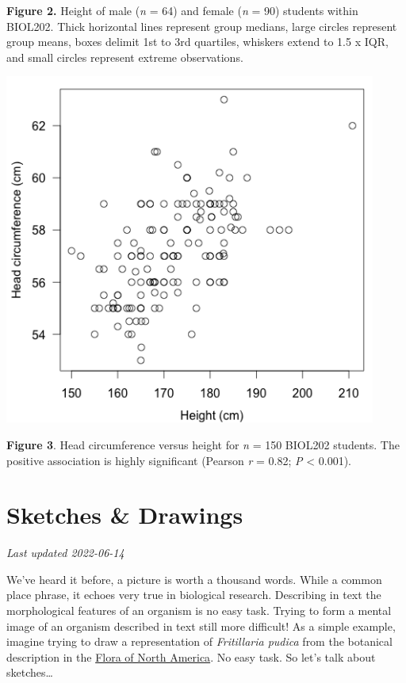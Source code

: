 \documentclass[
]{book}
\begin{document}
\textbf{Figure 2.} Height of male (\emph{n} = 64) and female (\emph{n} = 90) students within BIOL202. Thick horizontal lines represent group medians, large circles represent group means, boxes delimit 1st to 3rd quartiles, whiskers extend to 1.5 x IQR, and small circles represent extreme observations.

\includegraphics{images/FT_fig-3.png}

\textbf{Figure 3}. Head circumference versus height for \emph{n} = 150 BIOL202 students. The positive association is highly significant (Pearson \emph{r} = 0.82; \emph{P} \textless{} 0.001).

\hypertarget{sketches-drawings}{%
\chapter{Sketches \& Drawings}\label{sketches-drawings}}

\emph{Last updated 2022-06-14}

We've heard it before, a picture is worth a thousand words. While a common place phrase, it echoes very true in biological research. Describing in text the morphological features of an organism is no easy task. Trying to form a mental image of an organism described in text still more difficult! As a simple example, imagine trying to draw a representation of \emph{Fritillaria pudica} from the botanical description in the \href{http://www.efloras.org/florataxon.aspx?flora_id=1\&taxon_id=242101628}{Flora of North America}. No easy task. So let's talk about sketches\ldots{}
\end{document}
